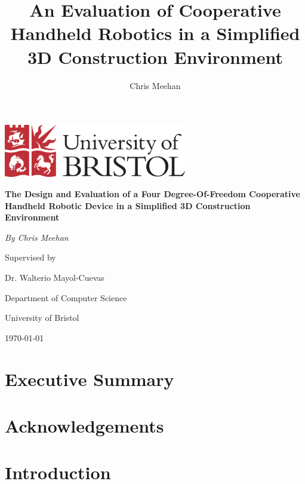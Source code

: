 \documentclass[11pt]{article}
\title{An Evaluation of Cooperative Handheld Robotics in a Simplified 3D Construction Environment}
\author{Chris Meehan}
\begin{document}
\begin{titlepage}
	\centering
	
	\includegraphics[width=0.6\textwidth]{bristol.png}
	\vspace{2cm}

	{\huge\bfseries The Design and Evaluation of a Four Degree-Of-Freedom Cooperative Handheld Robotic Device in a Simplified 3D Construction Environment\par}
	\vspace{1.5cm}

	{\Large\itshape By Chris Meehan\par}
	
	Supervised by\par
	Dr. Walterio Mayol-Cuevas
	
	\vspace{1.5cm}
	
	Department of Computer Science\par
	University of Bristol

	\vfill

	{\large \today\par}
\end{titlepage}

\renewcommand{\thepage}{\roman{page}}%
\section*{Executive Summary}
\pagebreak

\section*{Acknowledgements}
\pagebreak

\renewcommand{\thepage}{\arabic{page}}%

\setcounter{page}{1}%

\tableofcontents
\pagebreak



\section{Introduction}
\end{document}
